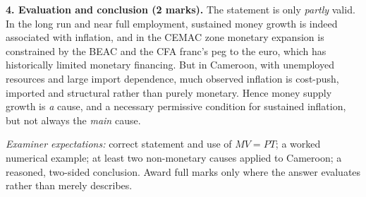 \documentclass[11pt]{article}
\begin{document}
\begin{corrige}
\textbf{4. Evaluation and conclusion (2 marks).} The statement is only \emph{partly} valid. In the long run and near full employment, sustained money growth is indeed associated with inflation, and in the CEMAC zone monetary expansion is constrained by the BEAC and the CFA franc's peg to the euro, which has historically limited monetary financing. But in Cameroon, with unemployed resources and large import dependence, much observed inflation is cost-push, imported and structural rather than purely monetary. Hence money supply growth is \emph{a} cause, and a necessary permissive condition for sustained inflation, but not always the \emph{main} cause.

\emph{Examiner expectations:} correct statement and use of $MV = PT$; a worked numerical example; at least two non-monetary causes applied to Cameroon; a reasoned, two-sided conclusion. Award full marks only where the answer evaluates rather than merely describes.
\end{corrige}
\end{document}
